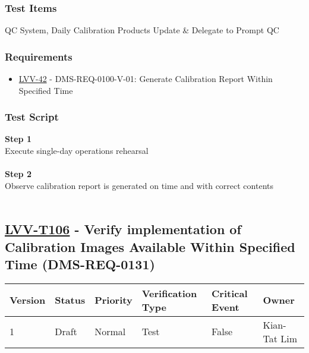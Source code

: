 \hypertarget{test-items-81}{%
\subsubsection{Test Items}\label{test-items-81}}

QC System, Daily Calibration Products Update \& Delegate to Prompt QC

\hypertarget{requirements-82}{%
\subsubsection{Requirements}\label{requirements-82}}

\begin{itemize}
\tightlist
\item
  \href{https://jira.lsstcorp.org/browse/LVV-42}{LVV-42} -
  DMS-REQ-0100-V-01: Generate Calibration Report Within Specified Time
\end{itemize}

\hypertarget{test-script-82}{%
\subsubsection{Test Script}\label{test-script-82}}

\textbf{Step 1}\\
Execute single-day operations rehearsal\\
~\\
\textbf{Step 2}\\
Observe calibration report is generated on time and with correct
contents\\
~\\

\hypertarget{lvv-t106---verify-implementation-of-calibration-images-available-within-specified-time-dms-req-0131}{%
\subsection{\texorpdfstring{\href{https://jira.lsstcorp.org/secure/Tests.jspa\#/testCase/LVV-T106}{LVV-T106}
- Verify implementation of Calibration Images Available Within Specified
Time
(DMS-REQ-0131)}{LVV-T106 - Verify implementation of Calibration Images Available Within Specified Time (DMS-REQ-0131)}}\label{lvv-t106---verify-implementation-of-calibration-images-available-within-specified-time-dms-req-0131}}

\begin{longtable}[]{@{}llllll@{}}
\toprule
Version & Status & Priority & Verification Type & Critical Event &
Owner\tabularnewline
\midrule
\endhead
1 & Draft & Normal & Test & False & Kian-Tat Lim\tabularnewline
\bottomrule
\end{longtable}

